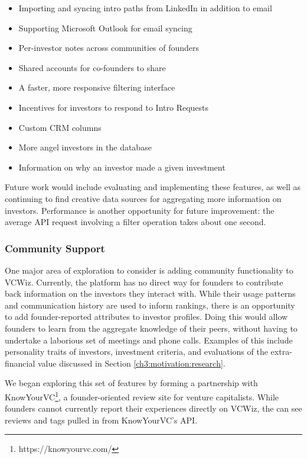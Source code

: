 \begin{itemize}
  \item Importing and syncing intro paths from LinkedIn in addition to email
  \item Supporting Microsoft Outlook for email syncing
  \item Per-investor notes across communities of founders
  \item Shared accounts for co-founders to share
  \item A faster, more responsive filtering interface
  \item Incentives for investors to respond to Intro Requests
  \item Custom CRM columns
  \item More angel investors in the database
  \item Information on why an investor made a given investment
\end{itemize}

Future work would include evaluating and implementing these features, as well as continuing to find creative data sources for aggregating more information on investors. Performance is another opportunity for future improvement: the average API request involving a filter operation takes about one second.

\subsubsection{Community Support}

One major area of exploration to consider is adding community functionality to VCWiz. Currently, the platform has no direct way for founders to contribute back information on the investors they interact with. While their usage patterns and communication history are used to inform rankings, there is an opportunity to add founder-reported attributes to investor profiles. Doing this would allow founders to learn from the aggregate knowledge of their peers, without having to undertake a laborious set of meetings and phone calls. Examples of this include personality traits of investors, investment criteria, and evaluations of the extra-financial value discussed in Section \ref{ch3:motivation:research}.

We began exploring this set of features by forming a partnership with KnowYourVC\footnote{https://knowyourvc.com/}, a founder-oriented review site for venture capitalists. While founders cannot currently report their experiences directly on VCWiz, the can see reviews and tags pulled in from KnowYourVC's API.

